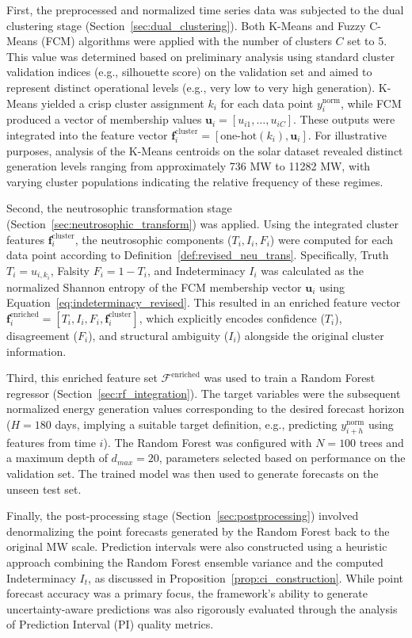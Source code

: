 \documentclass[review,3p,times]{elsarticle}
\begin{document}
First, the preprocessed and normalized time series data was subjected to the dual clustering stage (Section~\ref{sec:dual_clustering}). Both K-Means and Fuzzy C-Means (FCM) algorithms were applied with the number of clusters $C$ set to 5. This value was determined based on preliminary analysis using standard cluster validation indices (e.g., silhouette score) on the validation set and aimed to represent distinct operational levels (e.g., very low to very high generation). K-Means yielded a crisp cluster assignment $k_i$ for each data point $y_i^{\text{norm}}$, while FCM produced a vector of membership values $\mathbf{u}_i = [u_{i1}, \dots, u_{iC}]$. These outputs were integrated into the feature vector $\mathbf{f}_i^{\text{cluster}} = [\text{one-hot}(k_i), \mathbf{u}_i]$. For illustrative purposes, analysis of the K-Means centroids on the solar dataset revealed distinct generation levels ranging from approximately 736 MW to 11282 MW, with varying cluster populations indicating the relative frequency of these regimes.

Second, the neutrosophic transformation stage (Section~\ref{sec:neutrosophic_transform}) was applied. Using the integrated cluster features $\mathbf{f}_i^{\text{cluster}}$, the neutrosophic components ($T_i, I_i, F_i$) were computed for each data point according to Definition~\ref{def:revised_neu_trans}. Specifically, Truth $T_i = u_{i, k_i}$, Falsity $F_i = 1 - T_i$, and Indeterminacy $I_i$ was calculated as the normalized Shannon entropy of the FCM membership vector $\mathbf{u}_i$ using Equation~\ref{eq:indeterminacy_revised}. This resulted in an enriched feature vector $\mathbf{f}_i^{\text{enriched}} = [T_i, I_i, F_i, \mathbf{f}_i^{\text{cluster}}]$, which explicitly encodes confidence ($T_i$), disagreement ($F_i$), and structural ambiguity ($I_i$) alongside the original cluster information.

Third, this enriched feature set $\mathcal{F}^{\text{enriched}}$ was used to train a Random Forest regressor (Section~\ref{sec:rf_integration}). The target variables were the subsequent normalized energy generation values corresponding to the desired forecast horizon ($H=180$ days, implying a suitable target definition, e.g., predicting $y_{i+h}^{\text{norm}}$ using features from time $i$). The Random Forest was configured with $N=100$ trees and a maximum depth of $d_{max}=20$, parameters selected based on performance on the validation set. The trained model was then used to generate forecasts on the unseen test set.

Finally, the post-processing stage (Section~\ref{sec:postprocessing}) involved denormalizing the point forecasts generated by the Random Forest back to the original MW scale. Prediction intervals were also constructed using a heuristic approach combining the Random Forest ensemble variance and the computed Indeterminacy $I_t$, as discussed in Proposition~\ref{prop:ci_construction}. While point forecast accuracy was a primary focus, the framework's ability to generate uncertainty-aware predictions was also rigorously evaluated through the analysis of Prediction Interval (PI) quality metrics.
\end{document}
